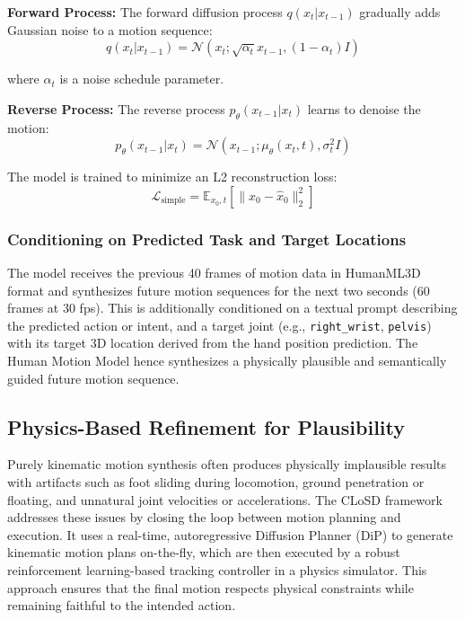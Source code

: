 \textbf{Forward Process:} The forward diffusion process $q(x_t|x_{t-1})$ gradually adds Gaussian noise to a motion sequence:
\begin{equation}
    q(x_t|x_{t-1}) = \mathcal{N}(x_t; \sqrt{\alpha_t}x_{t-1},(1-\alpha_t)I)
\end{equation}

where $\alpha_t$ is a noise schedule parameter.

\textbf{Reverse Process:} The reverse process $p_\theta(x_{t-1}|x_t)$ learns to denoise the motion:
\begin{equation}
    p_\theta(x_{t-1}|x_t) = \mathcal{N}(x_{t-1}; \mu_\theta(x_t,t),\sigma_t^2 I)
\end{equation}

The model is trained to minimize an L2 reconstruction loss:
\begin{equation}
    \mathcal{L}_{\text{simple}} = \mathbb{E}_{x_0,t}[\|x_0 - \hat{x}_0\|_2^2]
\end{equation}

\subsubsection{Conditioning on Predicted Task and Target Locations}

The model receives the previous 40 frames of motion data in HumanML3D format and synthesizes future motion sequences for the next two seconds (60 frames at 30 fps). This is additionally conditioned on a textual prompt describing the predicted action or intent, and a target joint (e.g., \texttt{right\_wrist}, \texttt{pelvis}) with its target 3D location derived from the hand position prediction. The Human Motion Model hence synthesizes a physically plausible and semantically guided future motion sequence.

\subsection{Physics-Based Refinement for Plausibility}

Purely kinematic motion synthesis often produces physically implausible results with artifacts such as foot sliding during locomotion, ground penetration or floating, and unnatural joint velocities or accelerations. The CLoSD framework \citep{tevet2024closd} addresses these issues by closing the loop between motion planning and execution. It uses a real-time, autoregressive Diffusion Planner (DiP) to generate kinematic motion plans on-the-fly, which are then executed by a robust reinforcement learning-based tracking controller in a physics simulator. This approach ensures that the final motion respects physical constraints while remaining faithful to the intended action.

